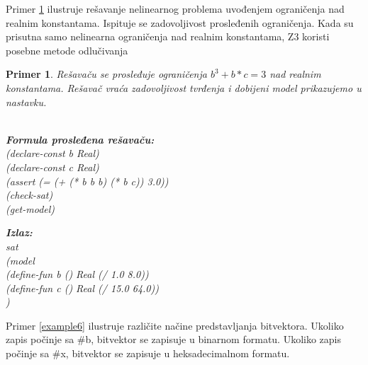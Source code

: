 \documentclass[12pt,oneside]{memoir}
\newcommand\tab[1][0.5cm]{\hspace*{#1}}
\newtheorem{primer}{Primer}
\begin{document}
Primer \ref{example5} ilustruje rešavanje nelinearnog problema uvođenjem ograničenja nad realnim konstantama. Ispituje se zadovoljivost prosleđenih ograničenja. Kada su prisutna samo nelinearna ograničenja nad realnim konstantama, Z3 koristi posebne metode odlučivanja\begin{primer} \label{example5} Rešavaču se prosleđuje ograničenja $b^{3} + b*c = 3$ nad realnim konstantama. Rešavač vraća zadovoljivost tvrđenja i dobijeni model prikazujemo u nastavku.   
\\ \\
\begin{minipage}[b]{0.43\textwidth}
\textbf{Formula prosleđena rešavaču:}
\\(declare-const b Real)
\\(declare-const c Real)
\\(assert (= (+ (* b b b) (* b c)) 3.0))
\\(check-sat)
\\(get-model)

\end{minipage}
\hspace{1.5cm}
\begin{minipage}[t]{0.45\textwidth}
\vspace{-3.4cm}
\textbf{Izlaz:}
\\sat 
\\(model 
\\\tab(define-fun b () Real (/ 1.0 8.0)) 
\\\tab(define-fun c () Real (/ 15.0 64.0))
\\)
\end{minipage}
\end{primer}
\par
Primer \ref{example6} ilustruje različite načine predstavljanja bitvektora. Ukoliko zapis počinje sa \#b, bitvektor se zapisuje u binarnom formatu. Ukoliko zapis počinje sa \#x, bitvektor se zapisuje u heksadecimalnom formatu.
\end{document}
